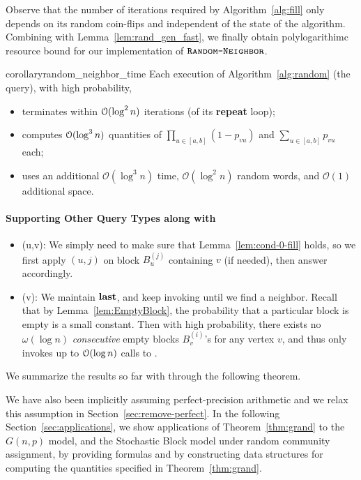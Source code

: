 Observe that the number of iterations required by Algorithm~\ref{alg:fill} only depends on its random coin-flips and independent of the state of the algorithm.
Combining with Lemma~\ref{lem:rand_gen_fast}, we finally obtain polylogarithimc resource bound for our implementation of $\texttt{\textsc{Random-Neighbor}}$.

\begin{restatable}{corollary}{random_neighbor_time}
\label{cor:random_neighbor_time}
Each execution of Algorithm~\ref{alg:random} (the  query), with high probability,
\begin{itemize}
\item terminates within $\mathcal{O}(\log^2 n)$ iterations (of its \textup{\textbf{repeat}} loop);
\item computes $\mathcal{O}(\log^3 n)$ quantities of $\prod_{u \in [a,b]} (1-p_{vu})$ and $\sum_{u\in[a,b]} p_{vu}$ each;
\item uses an additional $\mathcal O(\log^3 n)$ time, $\mathcal O(\log^2 n)$ random words, and $\mathcal O(1)$ additional space.
\end{itemize}
\end{restatable}

\paragraph*{Supporting Other Query Types along with }
\begin{itemize}
\item {}(u,v): We simply need to make sure that Lemma~\ref{lem:cond-0-fill} holds, so we first apply $(u,j)$ on block $B_u^{(j)}$ containing $v$ (if needed), then answer accordingly.
\item {}(v): We maintain $\mathbf{last}$, and keep invoking  until we find a neighbor. Recall that by Lemma~\ref{lem:EmptyBlock}, the probability that a particular block is empty is a small constant. Then with high probability, there exists no $\omega(\log n)$ \emph{consecutive} empty blocks $B^{(i)}_v$'s for any vertex $v$, and thus  only invokes up to $\mathcal{O}(\log n)$ calls to .
\end{itemize}

We summarize the results so far with through the following theorem.

\UndirectedGrand*

We have also been implicitly assuming perfect-precision arithmetic and we relax this assumption in Section~\ref{sec:remove-perfect}.
In the following Section~\ref{sec:applications}, we show applications of Theorem~\ref{thm:grand} to the $G(n,p)$ model,
and the Stochastic Block model under random community assignment,
by providing formulas and by constructing data structures for computing the quantities specified in Theorem~\ref{thm:grand}.
